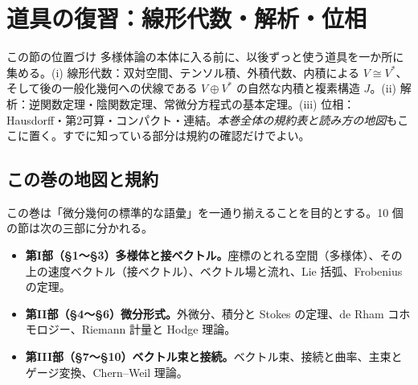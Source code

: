 \setcounter{section}{0}
\providecommand{\SL}{\mathrm{SL}}
\providecommand{\Alt}{\operatorname{Alt}}
\providecommand{\sgn}{\operatorname{sgn}}
\providecommand{\Gr}{\mathrm{Gr}}
\providecommand{\OO}{\mathrm{O}}
\providecommand{\Sym}{\mathrm{Sym}}
\providecommand{\Skew}{\mathrm{Skew}}

\section{道具の復習：線形代数・解析・位相}\label{A:sec1}
\begin{goalbox}{この節の位置づけ}
多様体論の本体に入る前に、以後ずっと使う道具を一か所に集める。(i) 線形代数：双対空間、テンソル積、外積代数、内積による $V\cong V^*$、そして後の一般化幾何への伏線である $V\oplus V^*$ の自然な内積と複素構造 $J$。(ii) 解析：逆関数定理・陰関数定理、常微分方程式の基本定理。(iii) 位相：Hausdorff・第2可算・コンパクト・連結。\emph{本巻全体の規約表と読み方の地図}もここに置く。すでに知っている部分は規約の確認だけでよい。
\end{goalbox}

\subsection{この巻の地図と規約}
この巻は「微分幾何の標準的な語彙」を一通り揃えることを目的とする。10 個の節は次の三部に分かれる。

\begin{itemize}
\item \textbf{第I部（§1〜§3）多様体と接ベクトル。}座標のとれる空間（多様体）、その上の速度ベクトル（接ベクトル）、ベクトル場と流れ、Lie 括弧、Frobenius の定理。
\item \textbf{第II部（§4〜§6）微分形式。}外微分、積分と Stokes の定理、de Rham コホモロジー、Riemann 計量と Hodge 理論。
\item \textbf{第III部（§7〜§10）ベクトル束と接続。}ベクトル束、接続と曲率、主束とゲージ変換、Chern--Weil 理論。
\end{itemize}

